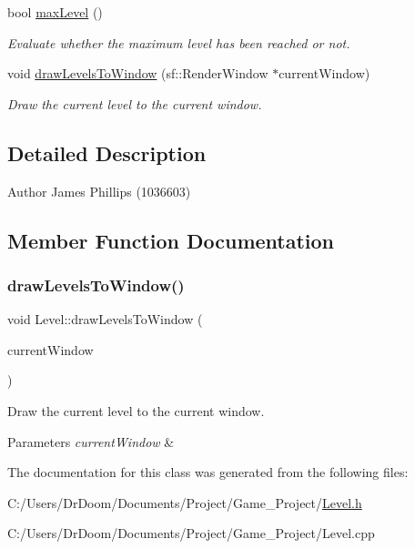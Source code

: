 \begin{DoxyCompactItemize}
bool \hyperlink{class_level_a702a1a057a4572ea37b701126501621a}{max\+Level} ()
\begin{DoxyCompactList}\small\item\em Evaluate whether the maximum level has been reached or not. \end{DoxyCompactList}\item 
void \hyperlink{class_level_a4cdf43966bbd49ea4f392762c4cd7991}{draw\+Levels\+To\+Window} (sf\+::\+Render\+Window $\ast$current\+Window)
\begin{DoxyCompactList}\small\item\em Draw the current level to the current window. \end{DoxyCompactList}\end{DoxyCompactItemize}


\subsection{Detailed Description}
\begin{DoxyAuthor}{Author}
James Phillips (1036603) 
\end{DoxyAuthor}


\subsection{Member Function Documentation}
\mbox{\label{class_level_a4cdf43966bbd49ea4f392762c4cd7991}} 
\subsubsection{\texorpdfstring{draw\+Levels\+To\+Window()}{drawLevelsToWindow()}}
{\footnotesize\ttfamily void Level\+::draw\+Levels\+To\+Window (\begin{DoxyParamCaption}\item[{sf\+::\+Render\+Window $\ast$}]{current\+Window }\end{DoxyParamCaption})}



Draw the current level to the current window. 


\begin{DoxyParams}{Parameters}
{\em current\+Window} & \\
\hline
\end{DoxyParams}


The documentation for this class was generated from the following files\+:\begin{DoxyCompactItemize}
\item 
C\+:/\+Users/\+Dr\+Doom/\+Documents/\+Project/\+Game\+\_\+\+Project/\hyperlink{_level_8h}{Level.\+h}\item 
C\+:/\+Users/\+Dr\+Doom/\+Documents/\+Project/\+Game\+\_\+\+Project/Level.\+cpp\end{DoxyCompactItemize}

